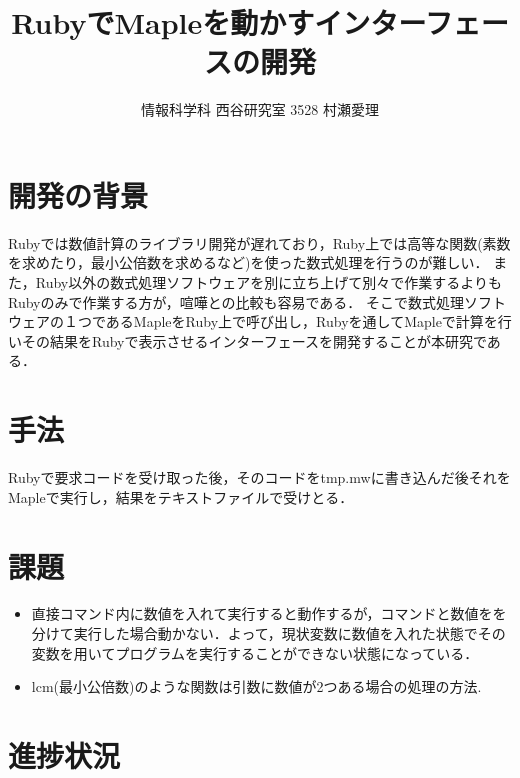 \documentclass[10pt,a4j,twocolumn]{jsarticle}
\begin{document}
\title{RubyでMapleを動かすインターフェースの開発}
\author{情報科学科 西谷研究室 3528 村瀬愛理}
\date{}
\maketitle
\section{開発の背景}
Rubyでは数値計算のライブラリ開発が遅れており，Ruby上では高等な関数(素数を求めたり，最小公倍数を求めるなど)を使った数式処理を行うのが難しい．
また，Ruby以外の数式処理ソフトウェアを別に立ち上げて別々で作業するよりもRubyのみで作業する方が，喧嘩との比較も容易である．
そこで数式処理ソフトウェアの１つであるMapleをRuby上で呼び出し，Rubyを通してMapleで計算を行いその結果をRubyで表示させるインターフェースを開発することが本研究である．

\section{手法}
Rubyで要求コードを受け取った後，そのコードをtmp.mwに書き込んだ後それをMapleで実行し，結果をテキストファイルで受けとる．

\section{課題}\begin{itemize}
\item 直接コマンド内に数値を入れて実行すると動作するが，コマンドと数値をを分けて実行した場合動かない．よって，現状変数に数値を入れた状態でその変数を用いてプログラムを実行することができない状態になっている．
\item lcm(最小公倍数)のような関数は引数に数値が2つある場合の処理の方法.
\end{itemize}
\section{進捗状況}
\end{document}
